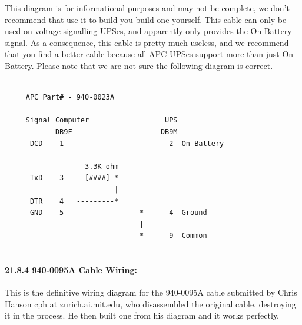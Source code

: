 \label{index-Cables-205}
This diagram is for informational purposes and may not be complete, we don't
recommend that use it to build you build one yourself.  This cable can only be
used on voltage-signalling UPSes, and apparently only provides the On Battery
signal. As a consequence, this cable is pretty much useless, and we recommend
that you find a better cable because all APC UPSes support more than just On
Battery. Please note that we are not sure the following diagram is correct. 

\footnotesize
\begin{verbatim}
     
     APC Part# - 940-0023A
     
     Signal Computer                  UPS
            DB9F                     DB9M
      DCD    1   --------------------  2  On Battery
     
                   3.3K ohm
      TxD    3   --[####]-*
                          |
      DTR    4   ---------*
      GND    5   ---------------*----  4  Ground
                                |
                                *----  9  Common
     
\end{verbatim}
\normalsize

\label{940_002d0095A-Cable-Wiring}

\paragraph*{21.8.4 940-0095A Cable Wiring:}

\label{index-Cables-206}
This is the definitive wiring diagram for the 940-0095A cable submitted by
Chris Hanson \lt{}cph at zurich.ai.mit.edu\gt{}, who disassembled the original
cable, destroying it in the process. He then built one from his diagram and it
works perfectly. 

